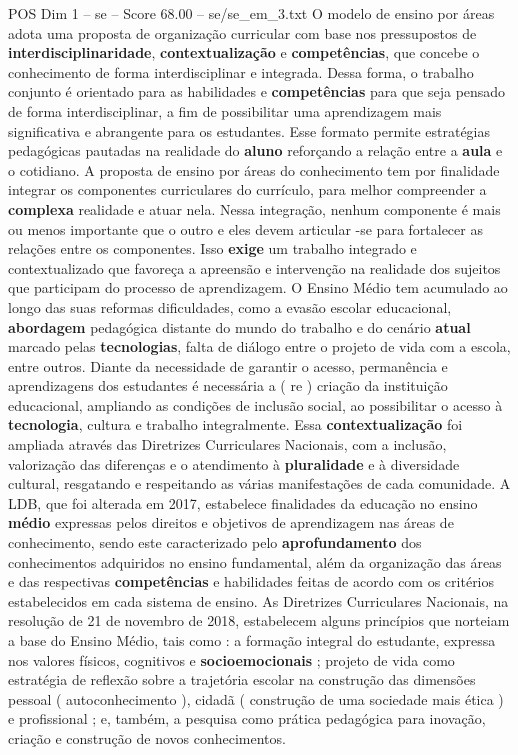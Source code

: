 \begin{textsample}{POS Dim 1 – se – Score 68.00 – se/se\_em\_3.txt}
O modelo de ensino por áreas adota uma proposta de organização curricular com base nos pressupostos de \textbf{interdisciplinaridade}, \textbf{contextualização} e \textbf{competências}, que concebe o conhecimento de forma interdisciplinar e integrada.
Dessa forma, o trabalho conjunto é orientado para as habilidades e \textbf{competências} para que seja pensado de forma interdisciplinar, a fim de possibilitar uma aprendizagem mais significativa e abrangente para os estudantes.
Esse formato permite estratégias pedagógicas pautadas na realidade do \textbf{aluno} reforçando a relação entre a \textbf{aula} e o cotidiano.
A proposta de ensino por áreas do conhecimento tem por finalidade integrar os componentes curriculares do currículo, para melhor compreender a \textbf{complexa} realidade e atuar nela.
Nessa integração, nenhum componente é mais ou menos importante que o outro e eles devem articular -se para fortalecer as relações entre os componentes.
Isso \textbf{exige} um trabalho integrado e contextualizado que favoreça a apreensão e intervenção na realidade dos sujeitos que participam do processo de aprendizagem.
O Ensino Médio tem acumulado ao longo das suas reformas dificuldades, como a evasão escolar educacional, \textbf{abordagem} pedagógica distante do mundo do trabalho e do cenário \textbf{atual} marcado pelas \textbf{tecnologias}, falta de diálogo entre o projeto de vida com a escola, entre outros.
Diante da necessidade de garantir o acesso, permanência e aprendizagens dos estudantes é necessária a ( re ) criação da instituição educacional, ampliando as condições de inclusão social, ao possibilitar o acesso à \textbf{tecnologia}, cultura e trabalho integralmente.
Essa \textbf{contextualização} foi ampliada através das Diretrizes Curriculares Nacionais, com a inclusão, valorização das diferenças e o atendimento à \textbf{pluralidade} e à diversidade cultural, resgatando e respeitando as várias manifestações de cada comunidade.
A LDB, que foi alterada em 2017, estabelece finalidades da educação no ensino \textbf{médio} expressas pelos direitos e objetivos de aprendizagem nas áreas de conhecimento, sendo este caracterizado pelo \textbf{aprofundamento} dos conhecimentos adquiridos no ensino fundamental, além da organização das áreas e das respectivas \textbf{competências} e habilidades feitas de acordo com os critérios estabelecidos em cada sistema de ensino.
As Diretrizes Curriculares Nacionais, na resolução de 21 de novembro de 2018, estabelecem alguns princípios que norteiam a base do Ensino Médio, tais como : a formação integral do estudante, expressa nos valores físicos, cognitivos e \textbf{socioemocionais} ; projeto de vida como estratégia de reflexão sobre a trajetória escolar na construção das dimensões pessoal ( autoconhecimento ), cidadã ( construção de uma sociedade mais ética ) e profissional ; e, também, a pesquisa como prática pedagógica para inovação, criação e construção de novos conhecimentos.

\end{textsample}
